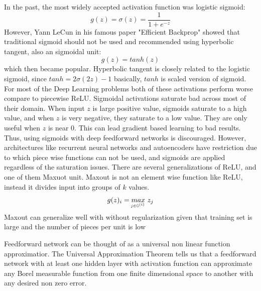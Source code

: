 \documentclass[paper=a4, fontsize=11pt]{scrartcl}
\numberwithin{equation}{section}		%
\numberwithin{figure}{section}			%
\numberwithin{table}{section}			%
\begin{document}
	
	In the past, the most widely accepted activation function was logistic sigmoid:
	 $$ g(z) = \sigma(z) = \frac{1}{1 + e^{-z}}$$
	However, Yann LeCun in his famous paper "Efficient Backprop" showed that traditional sigmoid should not be used and recommended using hyperbolic tangent, also an sigmoidal unit:
	$$ g(z) = tanh(z) $$
	which then became popular. Hyperbolic tangent is closely related to the logistic sigmoid, since $tanh = 2\sigma (2z)-1$ basically, $ tanh $ is scaled version of sigmoid. For most of the Deep Learning problems both of these activations perform worse compare to piecewise ReLU. Sigmoidal activations saturate bad across most of their domain. When input $z$ is large positive value, sigmoids saturate to a high value, and when $z$ is very negative, they saturate to a low value. They are only useful when $z$ is near 0. This can lead gradient based learning to bad results. Thus, using sigmoids with deep feedforward networks is discouraged. However, architectures like recurrent neural networks and autoencoders have restriction due to which piece wise functions can not be used, and sigmoids are applied regardless of the saturation issues. There are several generalizations of ReLU, and one of them Maxuot unit. Maxout is not an element wise function like ReLU, instead it divides input into groups of $k$ values. 
		$$ g(z)_i = \underaccent{j \in \mathbb G^{(i)}}{max} \ z_j$$
	Maxout can generalize well with without regularization given that training set is large and the number of pieces per unit is low \cite{Cai:2016:MND:2895845.2896008}
	\par Feedforward network can be thought of as a universal non linear function approximatior. The Universal Approximation Theorem \cite{Hornik1989359} tells us that a feedforward network with at least one hidden layer with activation function can approximate any Borel measurable function from one finite dimensional space to another with any desired non zero error.
	
\end{document}
